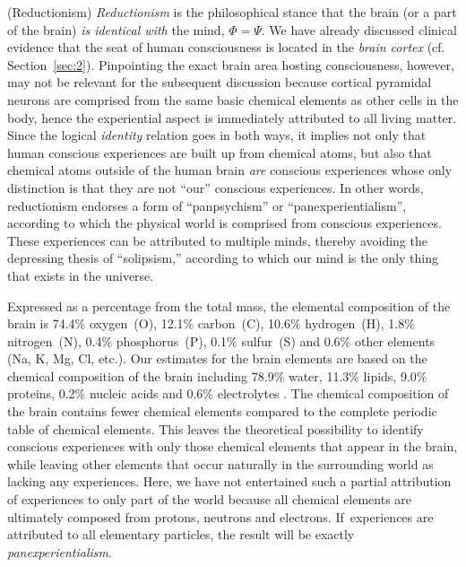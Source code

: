 \documentclass{ws-ijmpb}
\begin{document}
\begin{definition}
(Reductionism)
\emph{Reductionism} is the philosophical stance that the brain (or a part
of the brain) \emph{is identical with} the mind, $\Phi=\Psi$.
We have already discussed clinical evidence that the seat of human consciousness
is located in the \emph{brain cortex} (cf. Section~\ref{sec:2}).
Pinpointing the exact brain area hosting consciousness, however, may
not be relevant for the subsequent discussion because cortical pyramidal
neurons are comprised from the same basic chemical elements as other
cells in the body, hence the experiential aspect is immediately attributed to all living matter.
Since the logical \emph{identity} relation goes in both ways, it implies
not only that human conscious experiences are built up from chemical
atoms, but also that chemical atoms outside of the human brain \emph{are}
conscious experiences whose only distinction is that they are not ``our'' conscious experiences.
In other words, reductionism endorses a form of ``panpsychism'' or ``panexperientialism'', according to which the physical world is comprised from conscious experiences.
These experiences can be attributed to multiple minds, thereby avoiding the depressing thesis of ``solipsism,'' according to which our mind is the only thing that exists in the universe.
\end{definition}

Expressed as a percentage from the total mass,
the elemental composition of the brain is 74.4\% oxygen~(O), 12.1\%
carbon~(C), 10.6\% hydrogen~(H), 1.8\% nitrogen~(N), 0.4\% phosphorus~(P),
0.1\% sulfur~(S) and 0.6\% other elements (Na, K, Mg, Cl, etc.).
Our estimates for the brain elements are based on the chemical composition
of the brain including 78.9\% water, 11.3\% lipids, 9.0\% proteins,
0.2\% nucleic acids and 0.6\% electrolytes \cite{OBrien1965,Winick1968,Friede1971}.
The chemical composition of the brain contains fewer chemical elements compared to the complete periodic table of chemical elements.
This leaves the theoretical possibility to identify conscious
experiences with only those chemical elements that appear in the brain,
while leaving other elements that occur naturally in the surrounding
world as lacking any experiences. Here, we have not entertained such
a partial attribution of experiences to only part of the world because
all chemical elements are ultimately composed from protons, neutrons and electrons.
If~experiences are attributed to all
elementary particles, the result will be exactly \emph{panexperientialism}.
\end{document}
